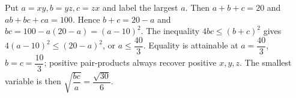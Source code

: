 Put $ a=xy,b=yz,c=zx $ and label the largest $ a $. Then $ a+b+c=20 $ and $ ab+bc+ca=100 $. Hence $ b+c=20-a $ and $ bc=100-a(20-a)=(a-10)^2 $. The inequality $ 4bc\le(b+c)^2 $ gives $ 4(a-10)^2\le(20-a)^2 $, or $ a\le\dfrac{40}{3}$. Equality is attainable at $ a=\dfrac{40}{3}$, $ b=c=\dfrac{10}{3}$; positive pair-products always recover positive $ x,y,z $. The smallest variable is then $\sqrt{\dfrac{bc}{a}}=\boxed{\dfrac{\sqrt{30}}{6}}$.
